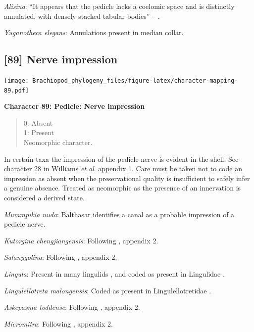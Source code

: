\documentclass[]{book}
\theoremstyle{definition}
\theoremstyle{definition}
\theoremstyle{definition}
\theoremstyle{remark}
\begin{document}
\emph{Alisina}: ``It appears that the pedicle lacks a coelomic space and
is distinctly annulated, with densely stacked tabular bodies'' --
\citet{Zhang2011Anobolellate}.

\emph{Yuganotheca elegans}: Annulations present in median collar.

\hypertarget{nerve-impression}{%
\subsection*{{[}89{]} Nerve impression}\label{nerve-impression}}

\texttt{[image: Brachiopod\_phylogeny\_files/figure-latex/character-mapping-89.pdf]}

\textbf{Character 89: Pedicle: Nerve impression}

\begin{quote}
0: Absent\\
1: Present\\
Neomorphic character.
\end{quote}

In certain taxa the impression of the pedicle nerve is evident in the
shell. See character 28 in Williams \emph{et al}.
\citeyearpar{Williams1998Thediversity} appendix 1. Care must be taken
not to code an impression as absent when the preservational quality is
insufficient to safely infer a genuine absence. Treated as neomorphic as
the presence of an innervation is considered a derived state.

\emph{Mummpikia nuda}: Balthasar
\citeyearpar[p.~274]{Balthasar2008iMummpikia} identifies a canal as a
probable impression of a pedicle nerve.

\emph{Kutorgina chengjiangensis}: Following
\citet{Williams1998Thediversity}, appendix 2.

\emph{Salanygolina}: Following \citet{Williams1998Thediversity},
appendix 2.

\emph{Lingula}: Present in many lingulids
\citep{Williams2000BrachiopodaLinguliformea}, and coded as present in
Lingulidae \citep[table 6]{Williams2000BrachiopodaLinguliformea}.

\emph{Lingulellotreta malongensis}: Coded as present in
Lingulellotretidae \citep[table
6]{Williams2000BrachiopodaLinguliformea}.

\emph{Askepasma toddense}: Following \citet{Williams1998Thediversity},
appendix 2.

\emph{Micromitra}: Following \citet{Williams1998Thediversity}, appendix
2.
\end{document}
